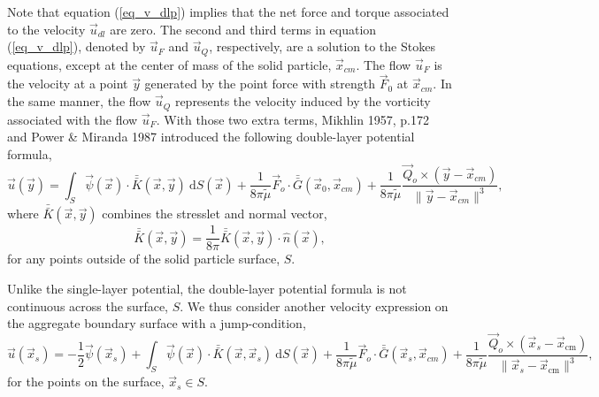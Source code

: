 Note that equation (\ref{eq_v_dlp}) implies that the net force and torque associated to the velocity $\vec{u}_{dl}$ are zero.
The second and third terms in equation (\ref{eq_v_dlp}), denoted by $\vec{u}_F$ and $\vec{u}_Q$, respectively, are a solution to the Stokes equations, except at the center of mass of the solid particle, $\vec{x}_{cm}$.
The flow $\vec{u}_F$ is the velocity at a point $\vec{y}$ generated by the point force with strength $\vec{F}_0$ at $\vec{x}_{cm}$. 
In the same manner, the flow $\vec{u}_Q$ represents the velocity induced by the vorticity associated with the flow $\vec{u}_F$.
With those two extra terms, Mikhlin 1957, p.172 \cite{smithies_integral_1959} and Power \& Miranda 1987 \cite{power_second_1987} introduced the following double-layer potential formula,
\begin{equation}
\vec{u}(\vec{y}) = \int_S
\vec{\psi}(\vec{x}) \cdot  \bar{\bar{K}}(\vec{x},\vec{y})  \ \text{d}S(\vec{x}) + 
\frac{1}{8 \pi \tilde{\mu} }\vec{F}_o \cdot \bar{\bar{G}}(\vec{x}_{0},\vec{x}_{cm})
+\frac{1}{8 \pi \tilde{\mu} } \frac{\vec{Q}_o \times  (\vec{y}   - \vec{x}_{cm} ) }{\| \vec{y}   - \vec{x}_{cm} \|^3 },
 \label{eq_BI_DL}
\end{equation}
where $ \bar{\bar{K}}(\vec{x},\vec{y})$ combines the stresslet and normal vector,
\begin{equation*}
	\bar{\bar{K}}(\vec{x},\vec{y})
	= \frac{1}{8 \pi} \bar{\bar{K}}(\vec{x},\vec{y})  \cdot \hat{n}(\vec{x}),
\end{equation*}
for any points outside of the solid particle surface, $S$.

\par
Unlike the single-layer potential, the double-layer potential formula is not continuous across the surface, $S$.
We thus consider another velocity expression on the aggregate boundary surface with a jump-condition,
\begin{equation}
\vec{u}(\vec{x}_s) = -\frac{1}{2} \vec{\psi}(\vec{x}_s) 
+\int_S  \vec{\psi}(\vec{x})  \cdot \bar{\bar{K}} (\vec{x},\vec{x}_s) \ \text{d}S(\vec{x}) 
+\frac{1}{8 \pi \tilde{\mu} } \vec{F}_o \cdot \bar{\bar{G}}(\vec{x}_{s},\vec{x}_{cm})
+\frac{1}{8 \pi \tilde{\mu} } \frac{\vec{Q}_o \times  (\vec{x}_s   - \vec{x}_{\text{cm}} ) }{\| \vec{x}_s  - \vec{x}_{\text{cm}} \|^3 },
\label{eq_BI_DL_on}
\end{equation}
for the points on the surface, $\vec{x}_s \in S$.

